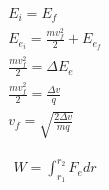 \documentclass{article}
\begin{document}
	\begin{gather*}
		E_i = E_f \\
		E_{e_i} = \frac{mv_f^2}{2} + E_{e_f}\\
		\frac{mv_f^2}{2} = \Delta E_e \\
		\frac{mv_f^2}{2} = \frac{\Delta v}{q} \\
		\boxed{v_f = \sqrt{\frac{2 \Delta v}{mq}}}
	\end{gather*}

	\begin{gather*}
		W = \int_{r_1}^{r_2} F_e dr
	\end{gather*}
\end{document}
